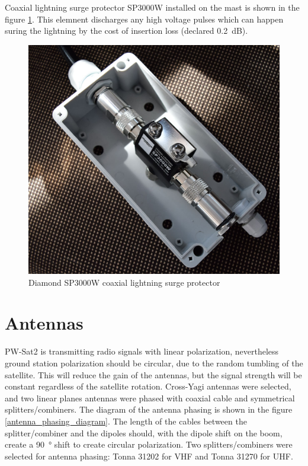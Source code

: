 Coaxial lightning surge protector SP3000W installed on the mast is shown in the figure \ref{coax_surge_protection}. This elemnent discharges any high voltage pulses which can happen suring the lightning by the cost of insertion loss (declared \SI{0.2}{\dB}).

\begin{figure}
    \centering
    \includegraphics[width=0.5\paperwidth]{img/7/coax_surge_protection.jpg}
    \caption{Diamond SP3000W coaxial lightning surge protector}
    \label{coax_surge_protection}
\end{figure}



\section{Antennas}
PW-Sat2 is transmitting radio signals with linear polarization, nevertheless ground station  polarization should be circular, due to the random tumbling of the satellite. This will reduce the gain of the antennas, but the signal strength will be constant regardless of the satellite rotation. Cross-Yagi antennas were selected, and two linear planes antennas were phased with coaxial cable and symmetrical splitters/combiners. The diagram of the antenna phasing is shown in the figure \ref{antenna_phasing_diagram}. The length of the cables between the splitter/combiner and the dipoles should, with the dipole shift on the boom, create a \SI{90}{\degree} shift to create circular polarization. Two splitters/combiners were selected for antenna phasing: Tonna 31202 for VHF and Tonna 31270 for UHF.

